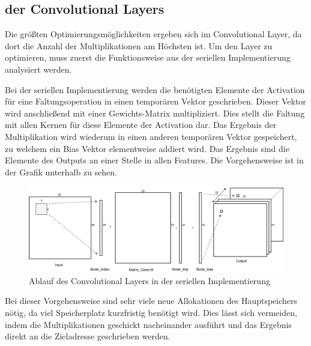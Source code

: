 \documentclass[../main.tex]{subfiles}
\begin{document}
\subsection{der Convolutional Layers}

Die größten Optimierungsmöglichkeiten ergeben sich im Convolutional Layer, da dort die Anzahl der Multiplikationen am Höchsten ist. Um den Layer zu optimieren, muss zuerst die Funktionsweise aus der seriellen Implementierung analysiert werden.

Bei der seriellen Implementierung werden die benötigten Elemente der Activation für eine Faltungsoperation in einen temporären Vektor geschrieben. Dieser Vektor wird anschließend mit einer Gewichts-Matrix multipliziert. Dies stellt die Faltung mit allen Kernen für diese Elemente der Activation dar. Das Ergebnis der Multiplikation wird wiederum in einen anderen temporären Vektor gespeichert, zu welchem ein Bias Vektor elementweise addiert wird. Das Ergebnis sind die Elemente des Outputs an einer Stelle in allen Features. Die Vorgehensweise ist in der Grafik unterhalb zu sehen.

\begin{figure}[!htbp]
	\centering
	\includegraphics[width=\textwidth]{../images/Benz/Conv_Layer_Seriel.png} %
	\caption{Ablauf des Convolutional Layers in der seriellen Implementierung} 
	\label{fig:conv_layer_seriell}
\end{figure}


Bei dieser Vorgehensweise sind sehr viele neue Allokationen des Hauptspeichers nötig, da viel Speicherplatz kurzfristig benötigt wird. Dies lässt sich vermeiden, indem die Multiplikationen geschickt nacheinander ausführt und das Ergebnis direkt an die Zieladresse geschrieben werden. 
\end{document}
